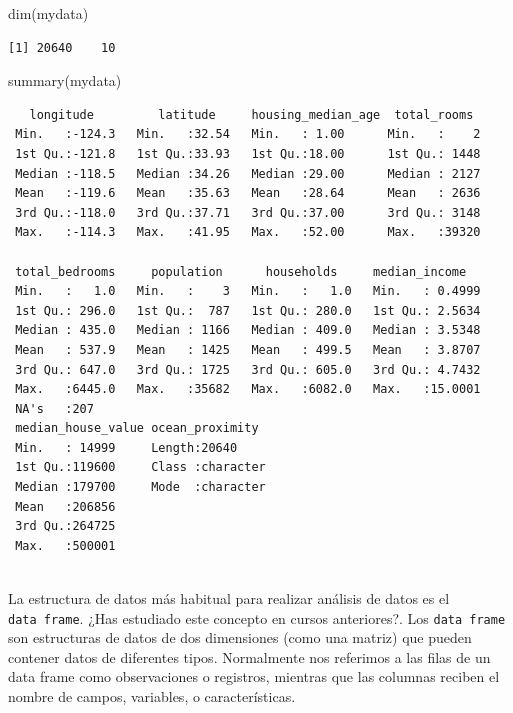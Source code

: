 \documentclass[
  letterpaper,
  DIV=11,
  numbers=noendperiod]{scrreprt}
\newenvironment{Shaded}{\begin{snugshade}}{\end{snugshade}}
\newcommand{\FunctionTok}[1]{\textcolor[rgb]{0.28,0.35,0.67}{#1}}
\newcommand{\NormalTok}[1]{\textcolor[rgb]{0.00,0.23,0.31}{#1}}
\begin{document}
\begin{Shaded}
\begin{Highlighting}[]
\FunctionTok{dim}\NormalTok{(mydata)}
\end{Highlighting}
\end{Shaded}

\begin{verbatim}
[1] 20640    10
\end{verbatim}

\begin{Shaded}
\begin{Highlighting}[]
\FunctionTok{summary}\NormalTok{(mydata)}
\end{Highlighting}
\end{Shaded}

\begin{verbatim}
   longitude         latitude     housing_median_age  total_rooms   
 Min.   :-124.3   Min.   :32.54   Min.   : 1.00      Min.   :    2  
 1st Qu.:-121.8   1st Qu.:33.93   1st Qu.:18.00      1st Qu.: 1448  
 Median :-118.5   Median :34.26   Median :29.00      Median : 2127  
 Mean   :-119.6   Mean   :35.63   Mean   :28.64      Mean   : 2636  
 3rd Qu.:-118.0   3rd Qu.:37.71   3rd Qu.:37.00      3rd Qu.: 3148  
 Max.   :-114.3   Max.   :41.95   Max.   :52.00      Max.   :39320  
                                                                    
 total_bedrooms     population      households     median_income    
 Min.   :   1.0   Min.   :    3   Min.   :   1.0   Min.   : 0.4999  
 1st Qu.: 296.0   1st Qu.:  787   1st Qu.: 280.0   1st Qu.: 2.5634  
 Median : 435.0   Median : 1166   Median : 409.0   Median : 3.5348  
 Mean   : 537.9   Mean   : 1425   Mean   : 499.5   Mean   : 3.8707  
 3rd Qu.: 647.0   3rd Qu.: 1725   3rd Qu.: 605.0   3rd Qu.: 4.7432  
 Max.   :6445.0   Max.   :35682   Max.   :6082.0   Max.   :15.0001  
 NA's   :207                                                        
 median_house_value ocean_proximity   
 Min.   : 14999     Length:20640      
 1st Qu.:119600     Class :character  
 Median :179700     Mode  :character  
 Mean   :206856                       
 3rd Qu.:264725                       
 Max.   :500001                       
                                      
\end{verbatim}

La estructura de datos más habitual para realizar análisis de datos es
el \texttt{data\ frame}. ¿Has estudiado este concepto en cursos
anteriores?. Los \texttt{data\ frame} son estructuras de datos de dos
dimensiones (como una matriz) que pueden contener datos de diferentes
tipos. Normalmente nos referimos a las filas de un data frame como
observaciones o registros, mientras que las columnas reciben el nombre
de campos, variables, o características.
\end{document}
